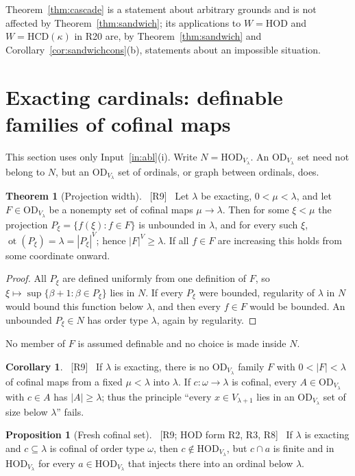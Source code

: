 \documentclass[11pt,letterpaper]{article}
\theoremstyle{definition}
\newtheorem{theorem}[definition]{Theorem}
\newtheorem{proposition}[definition]{Proposition}
\newtheorem{corollary}[definition]{Corollary}
\numberwithin{equation}{section}
\newcommand{\HOD}{\mathrm{HOD}}
\newcommand{\OD}{\mathrm{OD}}
\newcommand{\HCD}{\mathrm{HCD}}
\newcommand{\ot}{\operatorname{ot}}
\newcommand{\src}[1]{\unskip\ {\normalfont\small\sffamily\color{Olive}[#1]}\ }
\newcommand{\R}[1]{\textsf{R#1}}
\begin{document}
Theorem~\ref{thm:cascade} is a statement about arbitrary grounds and is not affected by Theorem~\ref{thm:sandwich}; its applications to $W=\HOD$ and $W=\HCD(\kappa)$ in \R{20} are, by Theorem~\ref{thm:sandwich} and Corollary~\ref{cor:sandwichcons}(b), statements about an impossible situation.

\section{Exacting cardinals: definable families of cofinal maps}\label{sec:width}

This section uses only Input~\ref{in:abl}(i). Write $N=\HOD_{V_\lambda}$. An $\OD_{V_\lambda}$ set need not belong to $N$, but an $\OD_{V_\lambda}$ set of ordinals, or graph between ordinals, does.

\begin{theorem}[Projection width]\label{thm:width}\src{R9}
Let $\lambda$ be exacting, $0<\mu<\lambda$, and let $F\in\OD_{V_\lambda}$ be a nonempty set of cofinal maps $\mu\to\lambda$. Then for some $\xi<\mu$ the projection $P_\xi=\{f(\xi):f\in F\}$ is unbounded in $\lambda$, and for every such $\xi$, $\ot(P_\xi)=\lambda=|P_\xi|^V$; hence $|F|^V\ge\lambda$. If all $f\in F$ are increasing this holds from some coordinate onward.
\end{theorem}

\begin{proof}
All $P_\xi$ are defined uniformly from one definition of $F$, so $\xi\mapsto\sup\{\beta+1:\beta\in P_\xi\}$ lies in $N$. If every $P_\xi$ were bounded, regularity of $\lambda$ in $N$ would bound this function below $\lambda$, and then every $f\in F$ would be bounded. An unbounded $P_\xi\in N$ has order type $\lambda$, again by regularity.
\end{proof}

No member of $F$ is assumed definable and no choice is made inside $N$.

\begin{corollary}\label{cor:odcover}\src{R9}
If $\lambda$ is exacting, there is no $\OD_{V_\lambda}$ family $F$ with $0<|F|<\lambda$ of cofinal maps from a fixed $\mu<\lambda$ into $\lambda$. If $c:\omega\to\lambda$ is cofinal, every $A\in\OD_{V_\lambda}$ with $c\in A$ has $|A|\ge\lambda$; thus the principle ``every $x\in V_{\lambda+1}$ lies in an $\OD_{V_\lambda}$ set of size below $\lambda$'' fails.
\end{corollary}

\begin{proposition}[Fresh cofinal set]\label{prop:fresh}\src{R9; HOD form R2, R3, R8}
If $\lambda$ is exacting and $c\subseteq\lambda$ is cofinal of order type $\omega$, then $c\notin\HOD_{V_\lambda}$, but $c\cap a$ is finite and in $\HOD_{V_\lambda}$ for every $a\in\HOD_{V_\lambda}$ that injects there into an ordinal below $\lambda$.
\end{proposition}
\end{document}
